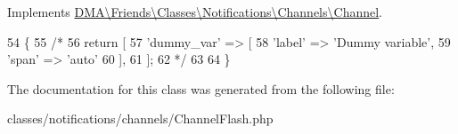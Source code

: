 Implements \hyperlink{interfaceDMA_1_1Friends_1_1Classes_1_1Notifications_1_1Channels_1_1Channel_aa473115fa58a6fa5f57a9069f23dd771}{D\+M\+A\textbackslash{}\+Friends\textbackslash{}\+Classes\textbackslash{}\+Notifications\textbackslash{}\+Channels\textbackslash{}\+Channel}.


\begin{DoxyCode}
54     \{
55         \textcolor{comment}{/*}
56 \textcolor{comment}{        return [}
57 \textcolor{comment}{            'dummy\_var' => [}
58 \textcolor{comment}{                'label' => 'Dummy variable',}
59 \textcolor{comment}{                'span'  => 'auto'}
60 \textcolor{comment}{            ],}
61 \textcolor{comment}{        ];}
62 \textcolor{comment}{        */}
63 
64     \}
\end{DoxyCode}


The documentation for this class was generated from the following file\+:\begin{DoxyCompactItemize}
\item 
classes/notifications/channels/Channel\+Flash.\+php\end{DoxyCompactItemize}
